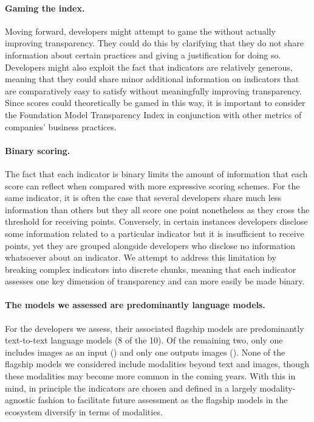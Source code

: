\paragraph{Gaming the index.}
Moving forward, developers might attempt to game the \projectname without actually improving transparency. 
They could do this by clarifying that they do not share information about certain practices and giving a justification for doing so. 
Developers might also exploit the fact that indicators are relatively generous, meaning that they could share minor additional information on indicators that are comparatively easy to satisfy without meaningfully improving transparency.
Since scores could theoretically be gamed in this way, it is important to consider the Foundation Model Transparency Index in conjunction with other metrics of companies' business practices. 

\paragraph{Binary scoring.} 
The fact that each indicator is binary limits the amount of information that each score can reflect when compared with more expressive scoring schemes.
For the same indicator, it is often the case that several developers share much less information than others but they all score one point nonetheless as they cross the threshold for receiving points.
Conversely, in certain instances developers disclose some information related to a particular indicator but it is insufficient to receive points, yet they are grouped alongside developers who disclose no information whatsoever about an indicator. 
We attempt to address this limitation by breaking complex indicators into discrete chunks, meaning that each indicator assesses one key dimension of transparency and can more easily be made binary.

\paragraph{The models we assessed are predominantly language models.} 
For the developers we assess, their associated flagship models are predominantly text-to-text language models (8 of the 10).
Of the remaining two, only one includes images as an input (\gptfour) and only one outputs images (\stablediffusion).
None of the flagship models we considered include modalities beyond text and images, though these modalities may become more common in the coming years. 
With this in mind, in principle the indicators are chosen and defined in a largely modality-agnostic fashion to facilitate future assessment as the flagship models in the ecosystem diversify in terms of modalities.

